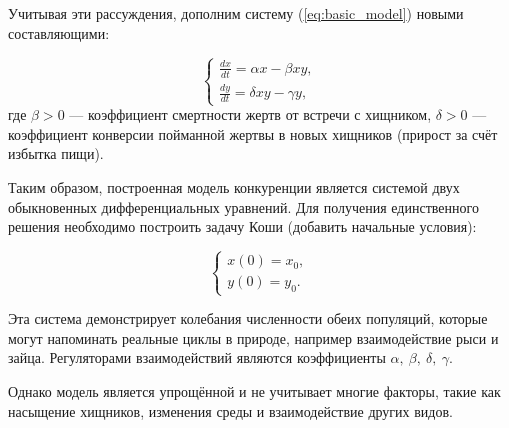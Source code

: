 Учитывая эти рассуждения, дополним систему (\ref{eq:basic_model}) новыми составляющими:

\begin{equation}
	\begin{cases}
		\frac{dx}{dt} = \alpha x - \beta x y,\\
		\frac{dy}{dt} = \delta x y - \gamma y,
	\end{cases}
	\label{eq:model}
\end{equation}
где $\beta > 0$ — коэффициент смертности жертв от встречи с хищником, $\delta > 0$ — коэффициент конверсии пойманной жертвы в новых хищников (прирост за счёт избытка пищи).

Таким образом, построенная модель конкуренции является системой двух обыкновенных дифференциальных уравнений. Для получения единственного решения необходимо построить задачу Коши (добавить начальные условия):

\begin{equation}
	\begin{cases}
		x(0) = x_0,\\
		y(0) = y_0.
	\end{cases}
	\label{eq:terms}
\end{equation}

Эта система демонстрирует колебания численности обеих популяций, которые могут напоминать реальные циклы в природе, например взаимодействие рыси и зайца. Регуляторами взаимодействий являются коэффициенты $\alpha, \ \beta, \ \delta, \ \gamma$. 

Однако модель является упрощённой и не учитывает многие факторы, такие как насыщение хищников, изменения среды и взаимодействие других видов.